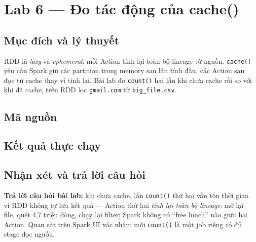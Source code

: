 \documentclass[12pt,a4paper,oneside]{article}
\begin{document}
\section{Lab 6 --- Đo tác động của cache()}
\label{sec:lab6}

\subsection{Mục đích và lý thuyết}

RDD là \emph{lazy} và \emph{ephemeral}: mỗi Action tính lại toàn bộ lineage từ nguồn. \texttt{cache()} yêu cầu Spark giữ các partition trong memory sau lần tính đầu, các Action sau đọc từ cache thay vì tính lại. Bài lab đo \texttt{count()} hai lần khi chưa cache rồi so với khi đã cache, trên RDD lọc \texttt{gmail.com} từ \texttt{big\_file.csv}.

\subsection{Mã nguồn}



\subsection{Kết quả thực chạy}



\subsection{Nhận xét và trả lời câu hỏi}

\textbf{Trả lời câu hỏi bài lab:} khi chưa cache, lần \texttt{count()} thứ hai vẫn tốn thời gian vì RDD không tự lưu kết quả --- Action thứ hai \emph{tính lại toàn bộ lineage}: mở lại file, quét 4,7 triệu dòng, chạy lại filter; Spark không có ``free lunch'' nào giữa hai Action. Quan sát trên Spark UI xác nhận: mỗi \texttt{count()} là một job riêng có đủ stage đọc nguồn.
\end{document}
